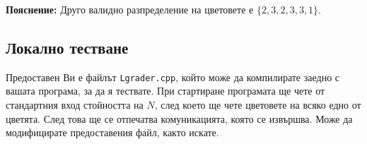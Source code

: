 \documentclass[12pt]{article}
\begin{document}
\textbf{Пояснение:} Друго валидно разпределение на цветовете е $\{2, 3, 2, 3, 3, 1\}$. 
	
\subsection{Локално тестване}
Предоставен Ви е файлът \texttt{Lgrader.cpp}, който може да компилирате заедно с вашата програма, за да я тествате. При стартиране програмата ще чете от стандартния вход стойността на $N$, след което ще чете цветовете на всяко едно от цветята. След това ще се отпечатва комуникацията, която се извършва. Може да модифицирате предоставения файл, както искате.
\end{document}
